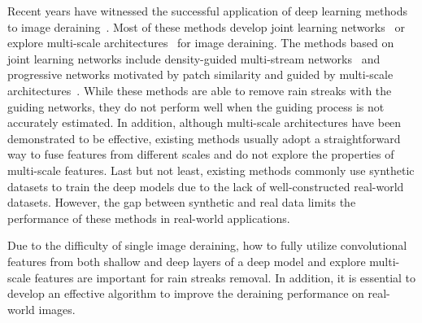 \documentclass[letterpaper]{article} %
\begin{document}
Recent years have witnessed the successful application of deep learning methods to image deraining~\cite{derain_ddn_fu,derain_jorder_yang,derain_rescan_li,derain_zhang_did,dualcnn-pan,spic-wang-derain,cvpr20_jiang_mspfn,mm20_wang_dcsfn,derain_mprnet_cvpr21,icassp-wang-derain,PhysicsGAN-pan}.
%
Most of these methods develop joint learning networks~\cite{derain_zhang_did,derain_cvpr19_hu,cvpr20_jiang_mspfn} or explore multi-scale architectures~\cite{mm20_wang_dcsfn,icme2020_zhu_phy,derain_mprnet_cvpr21} for image deraining.
%
The methods based on joint learning networks include density-guided multi-stream networks~\cite{derain_zhang_did} and progressive networks motivated by patch similarity and guided by multi-scale architectures~\cite{cvpr20_jiang_mspfn}.
While these methods are able to remove rain streaks with the guiding networks, they do not perform well when the guiding process is not accurately estimated.
%
In addition, although multi-scale architectures have been demonstrated to be effective, existing methods usually adopt a straightforward way to fuse features from different scales and do not explore the properties of multi-scale features.
Last but not least, existing methods commonly use synthetic datasets to train the deep models due to the lack of well-constructed real-world datasets. However, the gap between synthetic and real data limits the performance of these methods in real-world applications.

Due to the difficulty of single image deraining, how to fully utilize convolutional features from both shallow and deep layers of a deep model and explore multi-scale features are important for rain streaks removal. In addition, it is essential to develop an effective algorithm to improve the deraining performance on real-world images.
\end{document}

